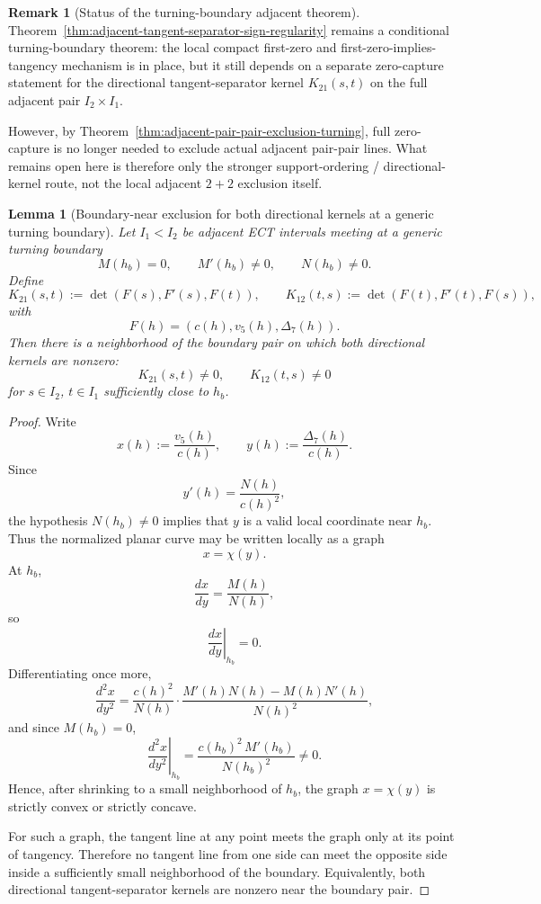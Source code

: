 \documentclass[11pt,a4paper]{amsart}
\theoremstyle{plain}
\newtheorem{lemma}[theorem]{Lemma}
\theoremstyle{definition}
\newtheorem{remark}[theorem]{Remark}
\begin{document}
\begin{remark}[Status of the turning-boundary adjacent theorem]
\label{rem:status-zero-capture-turning-boundary}
Theorem~\ref{thm:adjacent-tangent-separator-sign-regularity} remains a
conditional turning-boundary theorem: the local compact first-zero and
first-zero-implies-tangency mechanism is in place, but it still depends on a
separate zero-capture statement for the directional tangent-separator kernel
$K_{21}(s,t)$ on the full adjacent pair $I_2\times I_1$.

However, by Theorem~\ref{thm:adjacent-pair-pair-exclusion-turning}, full
zero-capture is no longer needed to exclude actual adjacent pair-pair lines.
What remains open here is therefore only the stronger support-ordering /
directional-kernel route, not the local adjacent $2+2$ exclusion itself.
\end{remark}

\begin{lemma}[Boundary-near exclusion for both directional kernels at a generic turning boundary]
\label{lem:boundary-near-directional-kernel-exclusion}
Let $I_1<I_2$ be adjacent ECT intervals meeting at a generic turning boundary
\[
M(h_b)=0,\qquad M'(h_b)\neq 0,\qquad N(h_b)\neq 0.
\]
Define
\[
K_{21}(s,t):=\det(F(s),F'(s),F(t)),
\qquad
K_{12}(t,s):=\det(F(t),F'(t),F(s)),
\]
with
\[
F(h)=(c(h),v_5(h),\Delta_7(h)).
\]
Then there is a neighborhood of the boundary pair on which both directional
kernels are nonzero:
\[
K_{21}(s,t)\neq 0,
\qquad
K_{12}(t,s)\neq 0
\]
for $s\in I_2$, $t\in I_1$ sufficiently close to $h_b$.
\end{lemma}

\begin{proof}
Write
\[
x(h):=\frac{v_5(h)}{c(h)},
\qquad
y(h):=\frac{\Delta_7(h)}{c(h)}.
\]
Since
\[
y'(h)=\frac{N(h)}{c(h)^2},
\]
the hypothesis $N(h_b)\neq 0$ implies that $y$ is a valid local
coordinate near $h_b$. Thus the normalized planar curve may be written
locally as a graph
\[
x=\chi(y).
\]
At $h_b$,
\[
\frac{dx}{dy}=\frac{M(h)}{N(h)},
\]
so
\[
\left.\frac{dx}{dy}\right|_{h_b}=0.
\]
Differentiating once more,
\[
\frac{d^2x}{dy^2}
=
\frac{c(h)^2}{N(h)}\cdot\frac{M'(h)N(h)-M(h)N'(h)}{N(h)^2},
\]
and since $M(h_b)=0$,
\[
\left.\frac{d^2x}{dy^2}\right|_{h_b}
=
\frac{c(h_b)^2\,M'(h_b)}{N(h_b)^2}\neq 0.
\]
Hence, after shrinking to a small neighborhood of $h_b$, the graph
$x=\chi(y)$ is strictly convex or strictly concave.

For such a graph, the tangent line at any point meets the graph only at its
point of tangency. Therefore no tangent line from one side can meet the
opposite side inside a sufficiently small neighborhood of the boundary.
Equivalently, both directional tangent-separator kernels are nonzero near the
boundary pair.
\end{proof}
\end{document}
